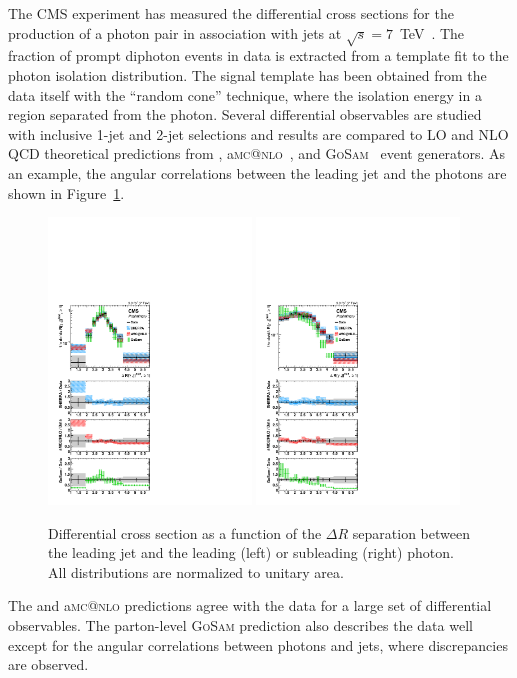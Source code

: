 \documentclass{PoS}
\makeatletter
\newcommand{\AMCATNLO} {a{\textsc{mc@nlo}}\xspace}
\newcommand{\GOSAM} {{\textsc{GoSam}}\xspace}
\makeatother
\begin{document}
The CMS experiment has measured the differential cross sections for the production of a photon pair in association with
jets at $\sqrt{s}=7$~TeV~\cite{CMS:2015hha}. The fraction of prompt diphoton events in data is extracted from a template fit to the photon
isolation distribution. The signal template has been obtained from the data itself with the ``random cone''
technique, where the isolation energy in a region separated from the photon. Several differential observables are
studied with inclusive 1-jet and 2-jet selections and results are compared to LO and NLO QCD theoretical predictions
from \SHERPA, \AMCATNLO~\cite{Alwall:2014hca}, and \GOSAM~\cite{Gehrmann:2013aga} event generators. As an example, the
angular correlations between the leading jet and the photons are shown in Figure~\ref{fig:diphot}. 
\begin{figure}
\begin{center}
\includegraphics[width=0.48\textwidth]{Figure13a.pdf}
\includegraphics[width=0.48\textwidth]{Figure13b.pdf}
\caption{Differential cross section as a function of the $\Delta R$ separation between the leading jet and the leading (left) or subleading (right) photon. All distributions are normalized to unitary area.}
\label{fig:diphot}
\end{center}
\end{figure}
The \SHERPA and
\AMCATNLO predictions agree with the data for a large set of differential 
observables. The parton-level \GOSAM prediction also describes the data well except for the angular correlations between
photons and jets, where discrepancies are observed.
\end{document}
